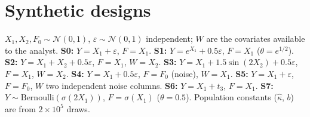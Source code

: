 \documentclass{article}
\begin{document}
\section{Synthetic designs}\label{app:synth}
$X_1,X_2,F_0\sim\mathcal N(0,1)$, $\varepsilon\sim\mathcal N(0,1)$ independent; $W$ are the covariates available to the analyst. \textbf{S0:} $Y=X_1+\varepsilon$, $F=X_1$. \textbf{S1:} $Y=e^{X_1}+0.5\varepsilon$, $F=X_1$ ($\theta=e^{1/2}$). \textbf{S2:} $Y=X_1+X_2+0.5\varepsilon$, $F=X_1$, $W=X_2$. \textbf{S3:} $Y=X_1+1.5\sin(2X_2)+0.5\varepsilon$, $F=X_1$, $W=X_2$. \textbf{S4:} $Y=X_1+0.5\varepsilon$, $F=F_0$ (noise), $W=X_1$. \textbf{S5:} $Y=X_1+\varepsilon$, $F=F_0$, $W$ two independent noise columns. \textbf{S6:} $Y=X_1+t_3$, $F=X_1$. \textbf{S7:} $Y\sim\mathrm{Bernoulli}(\sigma(2X_1))$, $F=\sigma(X_1)$ ($\theta=0.5$). Population constants ($\hat\kappa$, $b$) are from $2\times10^5$ draws.
\end{document}
